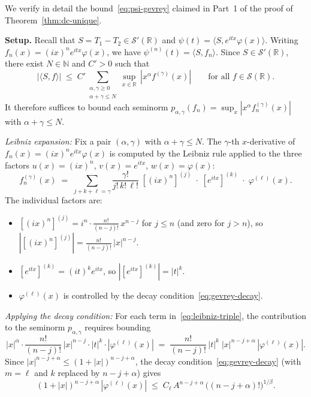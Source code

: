 \documentclass[12pt]{article}
\theoremstyle{definition}
\newcommand{\R}{\mathbb{R}}
\newcommand{\N}{\mathbb{N}}
\begin{document}
We verify in detail the bound~\eqref{eq:psi-gevrey} claimed in Part~1 of
the proof of Theorem~\ref{thm:dc-unique}.

\medskip
\noindent\textbf{Setup.}
Recall that $S = T_1 - T_2\in\mathcal{S}'(\R)$ and
$\psi(t) = \langle S, e^{itx}\varphi(x)\rangle$.  Writing
$f_n(x) = (ix)^n e^{itx}\varphi(x)$, we have
$\psi^{(n)}(t) = \langle S, f_n\rangle$.  Since
$S\in\mathcal{S}'(\R)$, there exist $N\in\N$ and $C'>0$ such that
\begin{equation}\label{eq:S-bound}
  |\langle S, f\rangle|
  \;\le\;
  C'\!\sum_{\substack{\alpha,\gamma\ge 0 \\ \alpha+\gamma\le N}}
  \sup_{x\in\R}\,|x^\alpha f^{(\gamma)}(x)|
  \qquad\text{for all }f\in\mathcal{S}(\R).
\end{equation}
It therefore suffices to bound each seminorm
$p_{\alpha,\gamma}(f_n) = \sup_x |x^\alpha f_n^{(\gamma)}(x)|$
with $\alpha+\gamma\le N$.

\medskip
\noindent\emph{Leibniz expansion:}
Fix a pair $(\alpha,\gamma)$ with $\alpha+\gamma\le N$.  The
$\gamma$-th $x$-derivative of $f_n(x)=(ix)^n e^{itx}\varphi(x)$ is
computed by the Leibniz rule applied to the three factors
$u(x)=(ix)^n$, $v(x)=e^{itx}$, $w(x)=\varphi(x)$:
\begin{equation}\label{eq:leibniz-triple}
  f_n^{(\gamma)}(x)
  \;=\;
  \sum_{j+k+\ell=\gamma}
  \frac{\gamma!}{j!\,k!\,\ell!}\;
  [(ix)^n]^{(j)}\;\cdot\;
  [e^{itx}]^{(k)}\;\cdot\;
  \varphi^{(\ell)}(x).
\end{equation}
The individual factors are:
\begin{itemize}
\item $[(ix)^n]^{(j)} = i^n \cdot \frac{n!}{(n-j)!}\,x^{n-j}$ for
$j\le n$ (and zero for $j>n$), so
$|[(ix)^n]^{(j)}| = \frac{n!}{(n-j)!}\,|x|^{n-j}$.
\item $[e^{itx}]^{(k)} = (it)^k e^{itx}$, so
$|[e^{itx}]^{(k)}| = |t|^k$.
\item $\varphi^{(\ell)}(x)$ is controlled by the decay
condition~\eqref{eq:gevrey-decay}.
\end{itemize}

\medskip
\noindent\emph{Applying the decay condition:}
For each term in~\eqref{eq:leibniz-triple}, the contribution to the
seminorm $p_{\alpha,\gamma}$ requires bounding
\[
  |x|^\alpha \cdot \frac{n!}{(n-j)!}\,|x|^{n-j}\cdot
  |t|^k\cdot|\varphi^{(\ell)}(x)|
  \;=\;
  \frac{n!}{(n-j)!}\,|t|^k\;
  |x|^{n-j+\alpha}\,|\varphi^{(\ell)}(x)|.
\]
Since $|x|^{n-j+\alpha}\le (1+|x|)^{n-j+\alpha}$, the decay
condition~\eqref{eq:gevrey-decay} (with $m=\ell$ and
$k$ replaced by $n-j+\alpha$) gives
\begin{equation}\label{eq:decay-applied}
  (1+|x|)^{n-j+\alpha}\,|\varphi^{(\ell)}(x)|
  \;\le\;
  C_\ell\,A^{n-j+\alpha}\,\bigl((n-j+\alpha)!\bigr)^{1/\beta}.
\end{equation}
\end{document}
